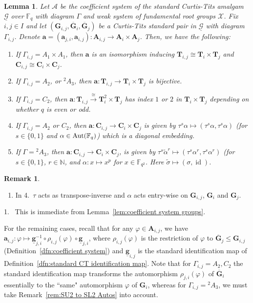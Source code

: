 \documentclass[12pt]{amsart}
\newtheorem{lemma}[theorem]{Lemma}
\theoremstyle{definition}
\newtheorem{remark}[theorem]{Remark}
\newcommand{\bpf}{\noindent{\bf Proof}\hspace{7pt}}
\newcommand{\ble}{\begin{lemma}}
\newcommand{\ele}{\end{lemma}}
\newcommand{\bre}{\begin{remark}}
\newcommand{\ere}{\end{remark}}
\newcommand{\ul}{\underline}
\newcommand{\twA}{{}^2\! {A}}
\newcommand{\Aut}{\mathop{\rm Aut}\nolimits}
\renewcommand{\bar}{\overline}
\DeclareMathOperator{\id}{id}
\newcommand{\FF}{{\mathbb F}}
\newcommand{\NN}{{\mathbb N}}
\newcommand{\after}{\mathbin{ \circ }}
\newcommand{\Chi}{{\mathcal X}}
\newcommand{\trin}{\tau}
\newcommand{\amgrpA}{{\mathbf{A}}}
\newcommand{\amgrpC}{{\mathbf{C}}}
\newcommand{\amgrpG}{{\mathbf{G}}}
\newcommand{\amgrpT}{{\mathbf{T}}}
\newcommand{\ama}{{\mathbf a}}
\newcommand{\famg}{\ul{\mathbf g}}
\newcommand{\bamgrpG}{\bar{\amgrpG}}
\newcommand{\amA}{{\mathscr{A}}}
\newcommand{\famG}{\ul{\mathscr{G}}}
\newcommand{\liediag}{\Gamma}
\begin{document}
\ble\label{lem: coefficient system connecting maps}
Let $\amA$ be the coefficient system of the standard Curtis-Tits amalgam $\famG$ over $\FF_q$ with diagram $\liediag$ and weak system of fundamental root groups $\Chi$.
Fix $i,j\in I$ and let $(\amgrpG_{i,j},\bamgrpG_i,\bamgrpG_j)$ be a Curtis-Tits standard pair in $\famG$ with diagram $\liediag_{i,j}$. Denote $\ama=(\ama_{j,i},\ama_{i,j})\colon \amgrpA_{i,j}\to \amgrpA_i\times\amgrpA_j$.
Then, we have the following:
\begin{enumerate}
\item If $\liediag_{i,j}=A_1\times A_1$, then $\ama$ is an isomorphism inducing $\amgrpT_{i,j}\cong\amgrpT_i\times\amgrpT_j$ and $\amgrpC_{i,j}\cong\amgrpC_i\times\amgrpC_j$.
\item If $\liediag_{i,j}=A_2$, or $\twA_3$, then $\ama\colon \amgrpT_{i,j}\to \amgrpT_i\times\amgrpT_j$ is bijective.
\item If $\liediag_{i,j}=C_2$, then $\ama\colon \amgrpT_{i,j}\stackrel{\cong}{\to}\amgrpT_i^2\times\amgrpT_j$ has index $1$ or $2$ in $\amgrpT_i\times\amgrpT_j$ depending on whether $q$ is even or odd.
\item If $\liediag_{i,j}=A_2$ or $C_2$, then 
 $\ama\colon\amgrpC_{i,j}\to\amgrpC_i\times\amgrpC_j$ is given by  $\trin^s\alpha\mapsto (\trin^s\alpha,\trin^s\alpha)$ (for $s\in \{0,1\}$ and $\alpha\in \Aut(\FF_q)$) which is a diagonal  embedding.
\item If $\liediag=\twA_3$, then $\ama\colon {\amgrpC}_{i,j}\to \amgrpC_i\times\amgrpC_j$, is given by 
 $\trin^s\widetilde{\alpha}^r\mapsto (\trin^s\alpha^r,\trin^s\alpha^r)$ (for $s\in \{0,1\}$, $r\in \NN$, and 
  $\alpha\colon x\mapsto x^p$ for $x\in \FF_{q^2}$.  Here $\widetilde{\sigma}\mapsto (\sigma,\id)$.
\end{enumerate}
\ele
\bre
\begin{enumerate}
\item In 4.~$\trin$ acts as transpose-inverse and $\alpha$ acts entry-wise on $\amgrpG_{i,j}$, $\amgrpG_i$ and $\amgrpG_j$.
\end{enumerate}
\ere
\bpf
1.~ This is immediate from Lemma~\ref{lem:coefficient system groups}.

For the remaining cases, recall that for any $\varphi\in \amgrpA_{i,j}$, we have 
 $\ama_{i,j}\colon \varphi\mapsto \famg_{j,i}^{-1}\after \rho_{i,j}(\varphi)\after\famg_{j,i}$, 
where $\rho_{i,j}(\varphi)$ is the restriction of $\varphi$ to $\bamgrpG_j\le \amgrpG_{i,j}$ (Definition~\ref{dfn:coefficient system}) and $\famg_{i,j}$ is the standard identification map of Definition~\ref{dfn:standard CT identification map}.
Note that for $\liediag_{i,j}=A_2,C_2$ the standard identification map transforms the automorphism $\rho_{j,i}(\varphi)$ of $\bamgrpG_i$ essentially to the ``same" automorphism $\varphi$ of $\amgrpG_i$, whereas for $\liediag_{i,j}=\twA_3$, we must take Remark~\ref{rem:SU2 to SL2 Autos} into account.
\end{document}
